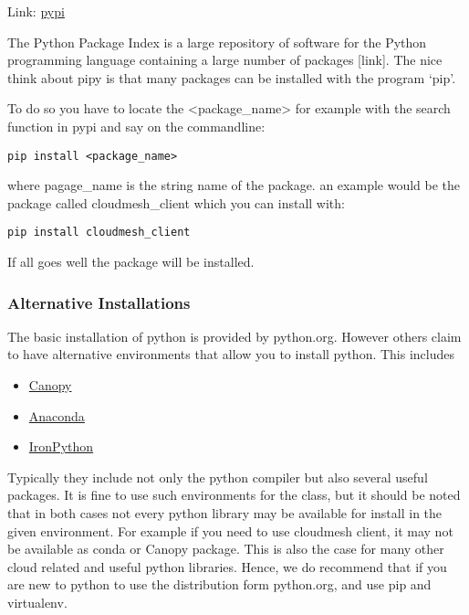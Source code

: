 Link: \href{https://pypi.python.org/pypi}{pypi}

The Python Package Index is a large repository of software for the
Python programming language containing a large number of packages
{[}link{]}. The nice think about pipy is that many packages can be
installed with the program `pip'.

To do so you have to locate the \textless{}package\_name\textgreater{}
for example with the search function in pypi and say on the commandline:

\begin{verbatim}
pip install <package_name>
\end{verbatim}

where pagage\_name is the string name of the package. an example would
be the package called cloudmesh\_client which you can install with:

\begin{verbatim}
pip install cloudmesh_client
\end{verbatim}

If all goes well the package will be installed.

\subsubsection{Alternative
Installations}\label{alternative-installations}

The basic installation of python is provided by python.org. However
others claim to have alternative environments that allow you to install
python. This includes

\begin{itemize}

\item
  \href{https://store.enthought.com/downloads/\#default}{Canopy}
\item
  \href{https://www.continuum.io/downloads}{Anaconda}
\item
  \href{http://ironpython.net/}{IronPython}
\end{itemize}

Typically they include not only the python compiler but also several
useful packages. It is fine to use such environments for the class, but
it should be noted that in both cases not every python library may be
available for install in the given environment. For example if you need
to use cloudmesh client, it may not be available as conda or Canopy
package. This is also the case for many other cloud related and useful
python libraries. Hence, we do recommend that if you are new to python
to use the distribution form python.org, and use pip and virtualenv.

